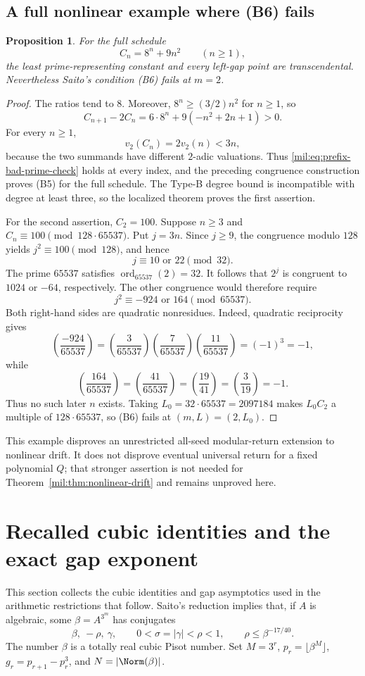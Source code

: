 \documentclass[11pt,a4paper]{article}
\newtheorem{proposition}[theorem]{Proposition}
\theoremstyle{definition}
\theoremstyle{remark}
\numberwithin{equation}{section}
\begin{document}
\subsection{A full nonlinear example where (B6) fails}
\begin{proposition}\label{mil:prop:nonlinear-b6-counterexample}
For the full schedule
\[
 C_n=8^n+9n^2\qquad(n\ge1),
\]
the least prime-representing constant and every left-gap point are
transcendental. Nevertheless Saito's condition (B6) fails at $m=2$.
\end{proposition}
\begin{proof}
The ratios tend to $8$. Moreover, $8^n\ge(3/2)n^2$ for $n\ge1$, so
\[
 C_{n+1}-2C_n=6\cdot8^n+9(-n^2+2n+1)>0.
\]
For every $n\ge1$,
\[
 v_2(C_n)=2v_2(n)<3n,
\]
because the two summands have different $2$-adic valuations.
Thus \eqref{mil:eq:prefix-bad-prime-check} holds at every index, and the
preceding congruence construction proves (B5) for the full schedule.
The Type-B degree bound is incompatible with degree at least three,
so the localized theorem proves the first assertion.

For the second assertion, $C_2=100$. Suppose $n\ge3$ and
$C_n\equiv100\pmod{128\cdot65537}$. Put $j=3n$. Since $j\ge9$,
the congruence modulo $128$ yields $j^2\equiv100\pmod{128}$, and hence
\[
 j\equiv10\text{ or }22\pmod{32}.
\]
The prime $65537$ satisfies $\operatorname{ord}_{65537}(2)=32$.
It follows that $2^j$ is congruent to $1024$ or $-64$, respectively.
The other congruence would therefore require
\[
 j^2\equiv-924\text{ or }164\pmod{65537}.
\]
Both right-hand sides are quadratic nonresidues. Indeed, quadratic
reciprocity gives
\[
 \left(\frac{-924}{65537}\right)
 =\left(\frac3{65537}\right)
  \left(\frac7{65537}\right)
  \left(\frac{11}{65537}\right)=(-1)^3=-1,
\]
while
\[
 \left(\frac{164}{65537}\right)
 =\left(\frac{41}{65537}\right)
 =\left(\frac{19}{41}\right)
 =\left(\frac3{19}\right)=-1.
\]
Thus no such later $n$ exists. Taking
$L_0=32\cdot65537=2097184$ makes $L_0C_2$ a multiple of
$128\cdot65537$, so (B6) fails at $(m,L)=(2,L_0)$.
\end{proof}

This example disproves an unrestricted all-seed modular-return
extension to nonlinear drift. It does not disprove eventual universal
return for a fixed polynomial $Q$; that stronger assertion is not
needed for Theorem~\ref{mil:thm:nonlinear-drift} and remains unproved here.

\section{Recalled cubic identities and the exact gap exponent}
\label{mil:sec:recalled-cubic}
This section collects the cubic identities and gap asymptotics used in the arithmetic restrictions that follow.
Saito's reduction implies that, if $A$ is algebraic, some $\beta=A^{3^m}$ has conjugates
\[
 \beta,\ -\rho,\ \gamma,\qquad
 0<\sigma=|\gamma|<\rho<1,
 \qquad \rho\le\beta^{-17/40}.
\]
The number $\beta$ is a totally real cubic Pisot number. Set $M=3^r$, $p_r=\lfloor\beta^M\rfloor$, $g_r=p_{r+1}-p_r^3$, and $N=|\Norm(\beta)|$.
\end{document}
